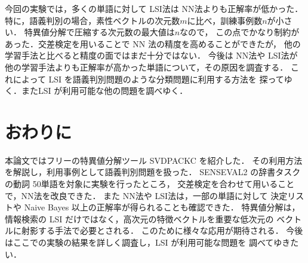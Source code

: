 今回の実験では，多くの単語に対して LSI法は NN法よりも正解率が低かった．
特に，語義判別の場合，素性ベクトルの次元数\( m \)に比べ，訓練事例数\( n \)が小さい．
特異値分解で圧縮する次元数の最大値は\( n \)なので，
この点でかなり制約があった．交差検定を用いることで NN 法の精度を高めることができたが，
他の学習手法と比べると精度の面ではまだ十分ではない．
今後は NN法や LSI法が他の学習手法よりも正解率が高かった単語について，その原因を調査する．
これによって LSI を語義判別問題のような分類問題に利用する方法を
探ってゆく．またLSI が利用可能な他の問題を調べゆく．





\section{おわりに}


本論文ではフリーの特異値分解ツール SVDPACKC を紹介した．
その利用方法を解説し，利用事例として語義判別問題を扱った．
SENSEVAL2 の辞書タスクの動詞 50単語を対象に実験を行ったところ，
交差検定を合わせて用いることで，NN法を改良できた．
また NN法や LSI法は，一部の単語に対して
決定リストや Naive Bayes 以上の正解率が得られることも確認できた．
特異値分解は，情報検索の LSI だけではなく，高次元の特徴ベクトルを重要な低次元の
ベクトルに射影する手法で必要とされる．
このために様々な応用が期待される．
今後はここでの実験の結果を詳しく調査し，LSI が利用可能な問題を
調べてゆきたい．








\newpage
\appendix


